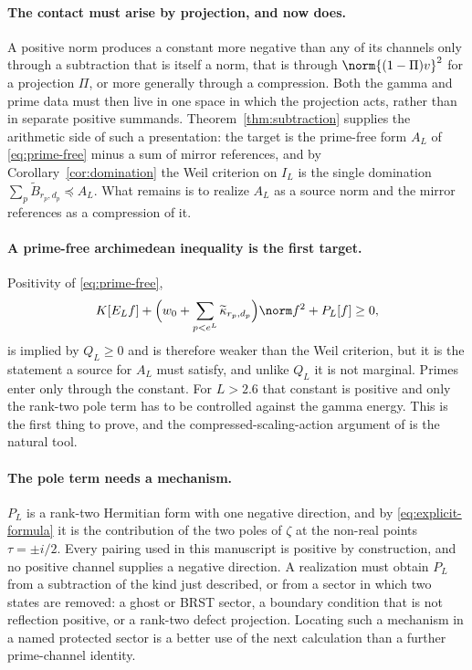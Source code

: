 \paragraph{The contact must arise by projection, and now does.}
A positive norm produces a constant more negative than any of its channels
only through a subtraction that is itself a norm, that is through
$\norm{(1-\Pi)v}^2$ for a projection $\Pi$, or more generally through a
compression. Both the gamma and prime data must then live in one space in
which the projection acts, rather than in separate positive summands.
Theorem~\ref{thm:subtraction} supplies the arithmetic side of such a
presentation: the target is the prime-free form $A_L$ of
\eqref{eq:prime-free} minus a sum of mirror references, and by
Corollary~\ref{cor:domination} the Weil criterion on $I_L$ is the single
domination $\sum_p\widetilde B_{r_p,d_p}\preceq A_L$. What remains is to
realize $A_L$ as a source norm and the mirror references as a compression of
it.

\paragraph{A prime-free archimedean inequality is the first target.}
Positivity of \eqref{eq:prime-free},
\begin{equation}\label{eq:prime-free-target}
 K[E_Lf]+\Big(w_0+\sum_{p<e^L}\widetilde\kappa_{r_p,d_p}\Big)\norm f^2
 +P_L[f]\geq0,
\end{equation}
is implied by $Q_L\geq0$ and is therefore weaker than the Weil criterion, but
it is the statement a source for $A_L$ must satisfy, and unlike $Q_L$ it is
not marginal. Primes enter only through the constant. For $L>2.6$ that
constant is positive and only the rank-two pole term has to be controlled
against the gamma energy. This is the first thing to prove, and the
compressed-scaling-action argument of \cite{CCWeil} is the natural tool.

\paragraph{The pole term needs a mechanism.}
$P_L$ is a rank-two Hermitian form with one negative direction, and by
\eqref{eq:explicit-formula} it is the contribution of the two poles of
$\zeta$ at the non-real points $\tau=\pm i/2$. Every pairing used in this
manuscript is positive by construction, and no positive channel supplies a
negative direction. A realization must obtain $P_L$ from a subtraction of
the kind just described, or from a sector in which two states are removed:
a ghost or BRST sector, a boundary condition that is not reflection
positive, or a rank-two defect projection. Locating such a mechanism in a
named protected sector is a better use of the next calculation than a
further prime-channel identity.

